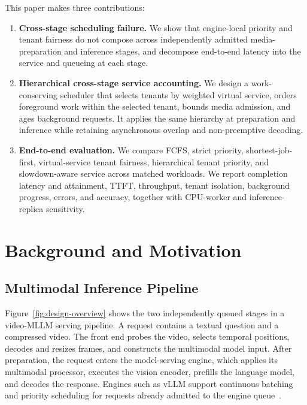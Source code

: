 \documentclass[sigconf,review,anonymous]{acmart}
\begin{document}
This paper makes three contributions:

\begin{enumerate}
    \item \textbf{Cross-stage scheduling failure.}
    We show that engine-local priority and tenant fairness do not compose
    across independently admitted media-preparation and inference stages, and
    decompose end-to-end latency into the service and queueing at each stage.

    \item \textbf{Hierarchical cross-stage service accounting.}
    We design a work-conserving scheduler that selects tenants by weighted
    virtual service, orders foreground work within the selected tenant, bounds
    media admission, and ages background requests. It applies the same
    hierarchy at preparation and inference while retaining asynchronous
    overlap and non-preemptive decoding.

    \item \textbf{End-to-end evaluation.}
    We compare FCFS, strict priority, shortest-job-first, virtual-service
    tenant fairness, hierarchical tenant priority, and slowdown-aware service
    across matched workloads. We report completion latency and attainment,
    TTFT, throughput, tenant isolation, background progress, errors, and
    accuracy, together with CPU-worker and inference-replica sensitivity.
\end{enumerate}

\section{Background and Motivation}

\subsection{Multimodal Inference Pipeline}

Figure~\ref{fig:design-overview} shows the two independently queued stages in
a video-MLLM serving pipeline. A request contains a textual question and a
compressed video. The front end probes the video, selects temporal positions,
decodes and resizes frames, and constructs the multimodal model input. After
preparation, the request enters the model-serving engine, which applies its
multimodal processor, executes the vision encoder, prefills the language
model, and decodes the response. Engines such as vLLM support continuous
batching and priority scheduling for requests already admitted to the engine
queue~\cite{vllm}.
\end{document}
